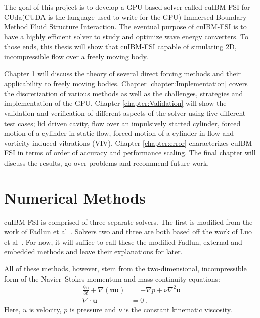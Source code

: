 \documentclass[onehalf,11pt]{beavtex}
\begin{document}
The goal of this project is to develop a GPU-based solver called cuIBM-FSI for CUda(CUDA is the language used to write for the GPU) Immersed Boundary Method Fluid Structure Interaction. 
The eventual purpose of cuIBM-FSI is to have a highly efficient solver to study and optimize wave energy converters. 
To those ends, this thesis will show that cuIBM-FSI capable of simulating 2D, incompressible flow over a freely moving body. 

Chapter \ref{chapter:Numerical Methods} will discuss the theory of several direct forcing methods and their applicability to freely moving bodies. 
Chapter \ref{chapter:Implementation} covers the discretization of various methods as well as the challenges, strategies and implementation of the GPU.
Chapter \ref{chapter:Validation} will show the validation and verification of different aspects of the solver using five different test cases; lid driven cavity, flow over an impulsively started cylinder, forced motion of a cylinder in static flow, forced motion of a cylinder in flow and vorticity induced vibrations (VIV). 
Chapter \ref{chapter:error} characterizes cuIBM-FSI in terms of order of accuracy and performance scaling. 
The final chapter will discuss the results, go over problems and recommend future work.

\chapter{Numerical Methods}\label{chapter:Numerical Methods}
cuIBM-FSI is comprised of three separate solvers. 
The first is modified from the work of Fadlun et al~\cite{Fadlun:2000fl}. 
Solvers two and three are both based off the work of Luo et al~\cite{Luo:2012gx}. 
For now, it will suffice to call these the modified Fadlun, external and embedded methods and leave their explanations for later. 


All of these methods, however, stem from the two-dimensional, incompressible form of the Navier--Stokes momentum and mass continuity equations:
\begin{align}
\frac{\partial \textbf{u}}{\partial t} + \nabla ( \textbf{uu} ) &= -\nabla p + \nu\nabla^{2}\textbf{u} \label{eq:NavierStokes} \\
\nabla \cdot \textbf{u} &= 0 \label{eq:Continuity} \;.
\end{align}
Here, $u$ is velocity, $p$ is pressure and $\nu$ is the constant kinematic viscosity.
\end{document}
